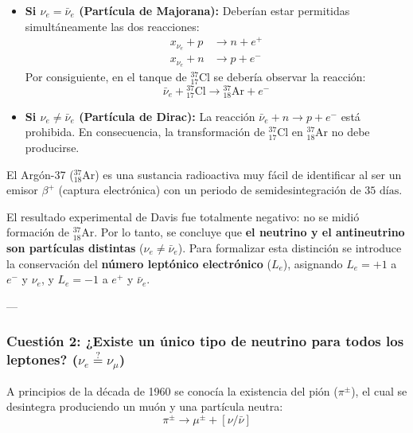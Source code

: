 \begin{itemize}
    \item \textbf{Si $\nu_e = \bar{\nu}_e$ (Partícula de Majorana):} Deberían estar permitidas simultáneamente las dos reacciones:
    \begin{align}
    x_{\nu_e} + p &\longrightarrow n + e^+ \\
    x_{\nu_e} + n &\longrightarrow p + e^-
    \end{align}
    Por consiguiente, en el tanque de ${}^{37}_{17}\text{Cl}$ se debería observar la reacción:
    \begin{equation}
    \bar{\nu}_e + {}^{37}_{17}\text{Cl} \longrightarrow {}^{37}_{18}\text{Ar} + e^-
    \end{equation}
    
    \item \textbf{Si $\nu_e \neq \bar{\nu}_e$ (Partícula de Dirac):} La reacción $\bar{\nu}_e + n \to p + e^-$ está prohibida. En consecuencia, la transformación de ${}^{37}_{17}\text{Cl}$ en ${}^{37}_{18}\text{Ar}$ no debe producirse.
\end{itemize}

El Argón-37 (${}^{37}_{18}\text{Ar}$) es una sustancia radioactiva muy fácil de identificar al ser un emisor $\beta^+$ (captura electrónica) con un periodo de semidesintegración de $35 \text{ días}$. 

El resultado experimental de Davis fue totalmente negativo: no se midió formación de ${}^{37}_{18}\text{Ar}$. Por lo tanto, se concluye que \textbf{el neutrino y el antineutrino son partículas distintas} ($\nu_e \neq \bar{\nu}_e$). Para formalizar esta distinción se introduce la conservación del \textbf{número leptónico electrónico} ($L_e$), asignando $L_e = +1$ a $e^-$ y $\nu_e$, y $L_e = -1$ a $e^+$ y $\bar{\nu}_e$.

---

\subsubsection{Cuestión 2: ¿Existe un único tipo de neutrino para todos los leptones? ($\nu_e \stackrel{?}{=} \nu_\mu$)}

A principios de la década de 1960 se conocía la existencia del pión ($\pi^\pm$), el cual se desintegra produciendo un muón y una partícula neutra:
\begin{equation}
\pi^\pm \longrightarrow \mu^\pm + [\nu / \bar{\nu}]
\end{equation}

